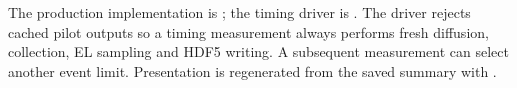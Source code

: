 \documentclass[10pt,a4paper]{article}
\begin{document}
The production implementation is ;
the timing driver is .
The driver rejects cached pilot outputs so a timing measurement always performs
fresh diffusion, collection, EL sampling and HDF5 writing. A subsequent measurement
can select another event limit. Presentation is regenerated from the saved summary
with .
\end{document}
